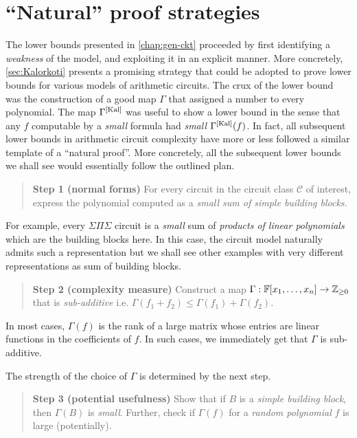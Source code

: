 \chapter{``Natural'' proof strategies}\label{sec:roadmap}

The lower bounds presented in \autoref{chap:gen-ckt} proceeded by first identifying a \emph{weakness} of the model, and exploiting it in an explicit manner. 
More concretely, \autoref{sec:Kalorkoti} presents a promising strategy that could be adopted to prove lower bounds for various models of arithmetic circuits. 
The crux of the lower bound was the construction of a good map $\Gamma$ that assigned a number to every polynomial. 
The map $\Gamma^{\mathrm{[Kal]}}$ was useful to show a lower bound in the sense that any $f$ computable by a \emph{small} formula had \emph{small} $\Gamma^{\mathrm{[Kal]}}(f)$. 
In fact, all subsequent lower bounds in arithmetic circuit complexity have more or less followed a similar template of a ``natural proof''. 
More concretely, all the subsequent lower bounds we shall see would essentially follow the outlined plan.  

\begin{quote}
{\bf Step 1 (normal forms)} For every circuit in the circuit class $\mathcal{C}$ of interest, express the polynomial computed as a \emph{small sum of simple building blocks}. 
\end{quote}

For example, every $\Sigma\Pi\Sigma$ circuit is a \emph{small} sum of \emph{products of linear polynomials} which are the building blocks here. 
In this case, the circuit model naturally admits such a representation but we shall see other examples with very different representations as sum of building blocks. 

\begin{quote}
{\bf Step 2 (complexity measure)} Construct a map $\Gamma: \mathbb{F}[x_1,\dots, x_n] \rightarrow \mathbb{Z}_{\geq 0}$ that is \emph{sub-additive} i.e. $\Gamma(f_1 + f_2)\leq \Gamma(f_1) + \Gamma(f_2)$.
\end{quote}

In most cases, $\Gamma(f)$ is the rank of a large matrix whose entries are linear functions in the coefficients of $f$. 
In such cases, we immediately get that $\Gamma$ is sub-additive. 

The strength of the choice of $\Gamma$ is determined by the next step. 

\begin{quote}
{\bf Step 3 (potential usefulness)} Show that if $B$ is a \emph{simple building block}, then $\Gamma(B)$ is \emph{small}.
Further, check if $\Gamma(f)$ for a \emph{random polynomial} $f$ is large (potentially). 
\end{quote}

